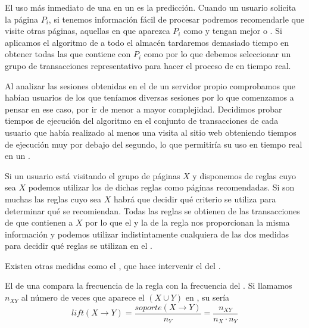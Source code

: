 El uso más inmediato de una \ar en un \srw es la predicción. Cuando un usuario solicita la página $P_i$, si tenemos información fácil de procesar podremos recomendarle que visite otras páginas, aquellas en que aparezca $P_i$ como \antecedente y tengan mejor \soporte o \confianza. Si aplicamos el algoritmo de \ARM a todo el almacén \D tardaremos demasiado tiempo en obtener todas las \ars que contiene con $P_i$ como \antecedente por lo que debemos seleccionar un grupo de transacciones representativo para hacer el proceso de \dm en tiempo real. 

Al analizar las sesiones obtenidas en el \flog de un servidor propio comprobamos que habían usuarios de los que teníamos diversas sesiones por lo que comenzamos a pensar en ese caso, por ir de menor a mayor complejidad. Decidimos probar tiempos de ejecución del algoritmo en el conjunto de transacciones de cada usuario que había realizado al menos una visita al sitio web obteniendo tiempos de ejecución muy por debajo del segundo, lo que permitiría su uso en tiempo real en un \srw.

Si un usuario está visitando el grupo de páginas $X$ y disponemos de reglas cuyo \antecedente sea $X$ podemos utilizar los \consecuentes de dichas reglas como páginas recomendadas. Si son muchas las reglas cuyo \antecedente sea $X$ habrá que decidir qué criterio se utiliza para determinar qué \consecuentes se recomiendan. Todas las reglas se obtienen de las transacciones de \D que contienen a $X$ por lo que el \soporte y la \confianza de la regla nos proporcionan la misma información y podemos utilizar indistintamente cualquiera de las dos medidas para decidir qué reglas se utilizan en el \SRW.

Existen otras medidas como el \lift, que hace intervenir el \soporte del \consecuente.

\begin{Definition}[\lift]
   El \lift de una \AR compara la frecuencia de la regla con la frecuencia del \consecuente. Si llamamos $n_{XY}$ al número de veces que aparece el \itemset $(X \cup Y)$ en \D, su \lift sería
  \begin{equation}\label{eq:1-3-2-lift-AR}
    lift(X \rightarrow Y) = \frac{soporte(X \rightarrow Y)}{n_Y} = \frac{n_{XY}}{n_X\cdot n_Y}
  \end{equation}
\label{def:1:3:2:lift:ar}
\end{Definition}

